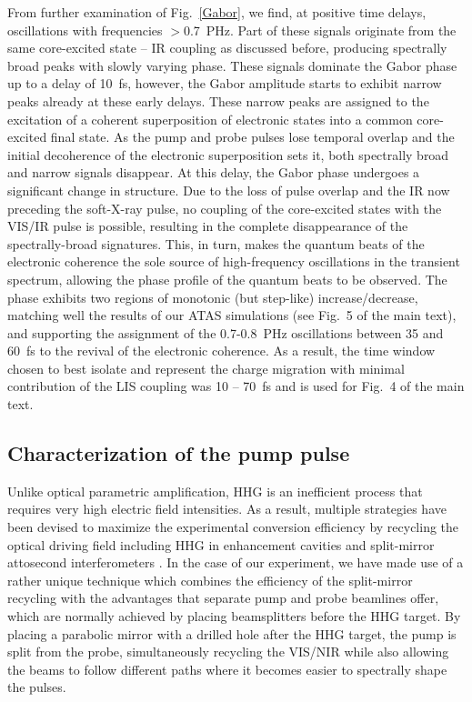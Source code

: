 \documentclass[12pt]{article}
\begin{document}
From further examination of Fig.~\ref{Gabor}, we find, at positive time delays, oscillations with frequencies $>$0.7~PHz. Part of these signals originate from the same core-excited state -- IR coupling as discussed before, producing spectrally broad peaks with slowly varying phase. These signals dominate the Gabor phase up to a delay of 10~fs, however, the Gabor amplitude starts to exhibit narrow peaks already at these early delays. These narrow peaks are assigned to the excitation of a coherent superposition of electronic states into a common core-excited final state. As the pump and probe pulses lose temporal overlap and the initial decoherence of the electronic superposition sets it, both spectrally broad and narrow signals disappear. At this delay, the Gabor phase undergoes a significant change in structure. Due to the loss of pulse overlap and the IR now preceding the soft-X-ray pulse, no coupling of the core-excited states with the VIS/IR pulse is possible, resulting in the complete disappearance of the spectrally-broad signatures. This, in turn, makes the quantum beats of the electronic coherence the sole source of high-frequency oscillations in the transient spectrum, allowing the phase profile of the quantum beats to be observed. The phase exhibits two regions of monotonic (but step-like) increase/decrease, matching well the results of our ATAS simulations (see Fig.~5 of the main text), and supporting the assignment of the 0.7-0.8~PHz oscillations between 35 and 60~fs to the revival of the electronic coherence. As a result, the time window chosen to best isolate and represent the charge migration with minimal contribution of the LIS coupling was 10 -- 70~fs and is used for Fig.~4 of the main text. 

\subsection{Characterization of the pump pulse}

Unlike optical parametric amplification, HHG is an inefficient process that requires very high electric field intensities. As a result, multiple strategies have been devised to maximize the experimental conversion efficiency by recycling the optical driving field including HHG in enhancement cavities and split-mirror attosecond interferometers \cite{Bernhardt2012,Kienberger2004}. In the case of our experiment, we have made use of a rather unique technique which combines the efficiency of the split-mirror recycling with the advantages that separate pump and probe beamlines offer, which are normally achieved by placing beamsplitters before the HHG target. By placing a parabolic mirror with a drilled hole after the HHG target, the pump is split from the probe, simultaneously recycling the VIS/NIR while also allowing the beams to follow different paths where it becomes easier to spectrally shape the pulses. 
\end{document}
